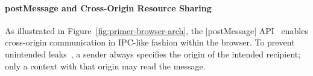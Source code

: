 

\paragraph{postMessage and Cross-Origin Resource Sharing}

As illustrated in Figure~\ref{fig:primer-browser-arch}, the
\js|postMessage| API~\cite{webmessaging} enables cross-origin
communication in IPC-like fashion within the browser. To prevent
unintended leaks~\cite{barth2009securing}, a sender always
specifies the origin of the intended recipient; only a context with
that origin may read the message.
%
%

